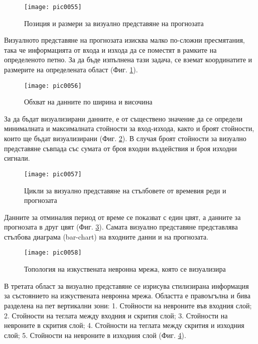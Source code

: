 \begin{figure}[h]
  \centering
  \texttt{[image: pic0055]}
  \caption{Позиция и размери за визуално представяне на прогнозата}
\label{fig:pic0055}
\end{figure}
\FloatBarrier

Визуалното представяне на прогнозата изисква малко по-сложни пресмятания, така че информацията от входа и изхода да се поместят в рамките на определеното петно. За да бъде изпълнена тази задача, се вземат координатите и размерите на определената област (Фиг. \ref{fig:pic0055}). 

\begin{figure}[h]
  \centering
  \texttt{[image: pic0056]}
  \caption{Обхват на данните по ширина и височина}
\label{fig:pic0056}
\end{figure}
\FloatBarrier

За да бъдат визуализирани данните, е от съществено значение да се определи минималната и максималната стойности за вход-изхода, както и броят стойности, които ще бъдат визуализирани (Фиг. \ref{fig:pic0056}). В случая броят стойности за визуално представяне съвпада със сумата от броя входни въздействия и броя изходни сигнали. 

\begin{figure}[h]
  \centering
  \texttt{[image: pic0057]}
  \caption{Цикли за визуално представяне на стълбовете от времевия реди и прогнозата}
\label{fig:pic0057}
\end{figure}
\FloatBarrier

Данните за отминалия период от време се показват с един цвят, а данните за прогнозата в друг цвят (Фиг. \ref{fig:pic0057}). Самата визуално представяне представлява стълбова диаграма (bar-chart) на входните данни и на прогнозата. 

\begin{figure}[h]
  \centering
  \texttt{[image: pic0058]}
  \caption{Топология на изкуствената невронна мрежа, която се визуализира}
\label{fig:pic0058}
\end{figure}
\FloatBarrier

В третата област за визуално представяне се изрисува стилизирана информация за състоянието на изкуствената невронна мрежа. Областта е правоъгълна и бива разделена на пет вертикални зони: 1. Стойности на невроните във входния слой; 2. Стойности на теглата между входния и скрития слой; 3. Стойности на невроните в скрития слой; 4. Стойности на теглата между скрития и изходния слой; 5. Стойности на невроните в изходния слой (Фиг. \ref{fig:pic0058}).


